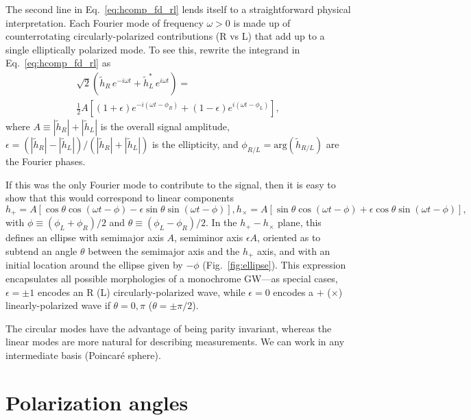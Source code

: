 \documentclass[aps,prd,twocolumn,superscriptaddress,preprintnumbers,floatfix,nofootinbib]{revtex4-2}
\newcommand{\beq}{\begin{equation}}
\newcommand{\eeq}{\end{equation}}
\newcommand*{\mi}[1]{}
\newcommand*{\mi}[1]{{\color{magenta} [{\bf MAX}: #1]}}
\begin{document}
The second line in Eq.~\eqref{eq:hcomp_fd_rl} lends itself to a straightforward physical interpretation.
Each Fourier mode of frequency $\omega>0$ is made up of counterrotating circularly-polarized contributions (R vs L) that add up to a single elliptically polarized mode.
To see this, rewrite the integrand in Eq.~\eqref{eq:hcomp_fd_rl} as
\begin{align}
\sqrt{2} \left(\tilde{h}_R\, e^{-i \omega t} + \tilde{h}_L^*\, e^{i \omega t}\right) =\nonumber\\
\frac{1}{2}A\left[ \left(1+\epsilon\right) e^{-i (\omega t - \phi_R)} + \left(1-\epsilon\right) e^{i (\omega t - \phi_L)} \right],
\end{align}
where
$A \equiv |\tilde{h}_R| + |\tilde{h}_L|$ is the overall signal amplitude, $\epsilon = (|\tilde{h}_R| - |\tilde{h}_L|)/(|\tilde{h}_R| + |\tilde{h}_L|)$ is the ellipticity, and $\phi_{R/L} = \mathrm{arg}(\tilde{h}_{R/L})$ are the Fourier phases.
\mi{need factors of $\sqrt{2}$ or similar---track down from FFT definition in  Eq.~\eqref{eq:hcomp_fd}}
If this was the only Fourier mode to contribute to the signal, then it is easy to show that this would correspond to linear components
\begin{subequations}
\beq
h_+ = A \left[\cos \theta \cos(\omega t - \phi) - \epsilon \sin \theta \sin(\omega t - \phi)\right] ,
\eeq
\beq
h_\times = A \left[\sin \theta \cos(\omega t - \phi) + \epsilon \cos \theta \sin(\omega t - \phi)\right] ,
\eeq
\end{subequations}
with $\phi \equiv (\phi_L + \phi_R)/2$ and $\theta \equiv (\phi_L - \phi_R)/2$. 
In the $h_+{-}h_\times$ plane, this defines an ellipse with semimajor axis $A$, semiminor axis $\epsilon A$, oriented as to subtend an angle $\theta$ between the semimajor axis and the $h_+$ axis, and with an initial location around the ellipse given by $-\phi$ (Fig.~\ref{fig:ellipse}).
This expression encapsulates all possible morphologies of a monochrome GW---as special cases, $\epsilon = \pm 1$ encodes an R (L) circularly-polarized wave, while $\epsilon =0$ encodes a $+$ ($\times$) linearly-polarized wave if $\theta = 0,\pi$ ($\theta = \pm \pi/2$).

The circular modes have the advantage of being parity invariant, whereas the linear modes are more natural for describing measurements.
We can work in any intermediate basis (Poincar\'e sphere).
\mi{introduce Jones vectors}

\section{Polarization angles}
\end{document}
